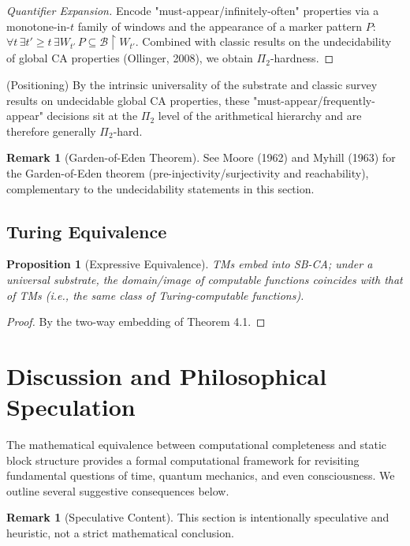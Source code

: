 \documentclass[12pt]{article}
\theoremstyle{plain}
\newtheorem{proposition}[theorem]{Proposition}
\theoremstyle{definition}
\newtheorem{remark}[theorem]{Remark}
\begin{document}
\begin{proof}[Quantifier Expansion]
Encode "must-appear/infinitely-often" properties via a monotone-in-$t$ family of windows and the appearance of a marker pattern $P$: $\forall t\,\exists t'\ge t\,\exists W_{t'}\,P\subseteq\mathcal{B}\upharpoonright W_{t'}$. Combined with classic results on the undecidability of global CA properties (Ollinger, 2008)\cite{ollinger2008}, we obtain $\Pi_2$-hardness.
\end{proof}

(Positioning) By the intrinsic universality of the substrate and classic survey results on undecidable global CA properties, these "must-appear/frequently-appear" decisions sit at the $\Pi_2$ level of the arithmetical hierarchy and are therefore generally $\Pi_2$-hard.

\begin{remark}[Garden-of-Eden Theorem]
See Moore (1962)\cite{moore1962} and Myhill (1963)\cite{myhill1963} for the Garden-of-Eden theorem (pre-injectivity/surjectivity and reachability), complementary to the undecidability statements in this section.
\end{remark}

\subsection{Turing Equivalence}

\begin{proposition}[Expressive Equivalence]
TMs embed into SB-CA; under a universal substrate, the domain/image of computable functions coincides with that of TMs (i.e., the same class of Turing-computable functions).
\end{proposition}

\begin{proof}
By the two-way embedding of Theorem 4.1.
\end{proof}

\section{Discussion and Philosophical Speculation}

The mathematical equivalence between computational completeness and static block structure provides a formal computational framework for revisiting fundamental questions of time, quantum mechanics, and even consciousness. We outline several suggestive consequences below.

\begin{remark}[Speculative Content]
This section is intentionally speculative and heuristic, not a strict mathematical conclusion.
\end{remark}
\end{document}
